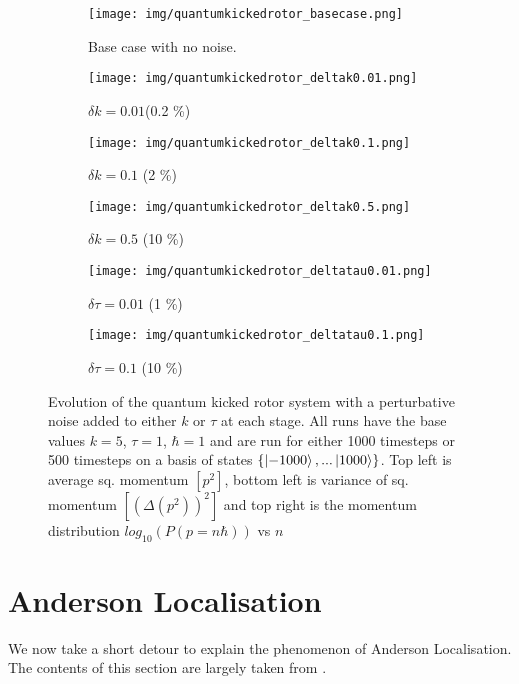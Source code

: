\documentclass[twocolumn]{report}
\begin{document}
\begin{figure}
    \begin{subfigure}[b]{0.5 \textwidth}
        \texttt{[image: img/quantumkickedrotor\_basecase.png]}
        \centering
        \caption{Base case with no noise.}
    \end{subfigure}
    \begin{subfigure}[b]{0.5 \textwidth}
        \centering
        \texttt{[image: img/quantumkickedrotor\_deltak0.01.png]}
        \caption{$\delta k = 0.01$(0.2 \%)}
    \end{subfigure}
    \begin{subfigure}[b]{0.5 \textwidth}
        \centering
        \texttt{[image: img/quantumkickedrotor\_deltak0.1.png]}
        \caption{$\delta k = 0.1$ (2 \%)}
    \end{subfigure}
    \begin{subfigure}[b]{0.5 \textwidth}
        \centering
        \texttt{[image: img/quantumkickedrotor\_deltak0.5.png]}
        \caption{$\delta k = 0.5$ (10 \%)}
    \end{subfigure}
    \begin{subfigure}[b]{0.5 \textwidth}
        \centering
        \texttt{[image: img/quantumkickedrotor\_deltatau0.01.png]}
        \caption{$\delta \tau = 0.01$ (1 \%)}
    \end{subfigure}
    \begin{subfigure}[b]{0.5 \textwidth}
        \centering
        \texttt{[image: img/quantumkickedrotor\_deltatau0.1.png]}
        \caption{$\delta \tau = 0.1$ (10 \%)}
    \end{subfigure}
    \caption{Evolution of the quantum kicked rotor system with a perturbative
    noise added to either $k$ or $\tau$ at each stage. All runs have the base
    values $k = 5$, $\tau = 1$, $\hbar = 1$ and are run for either 1000
    timesteps or 500 timesteps on a basis of states
    $\{\ket{-1000}, ...\ket{1000}\}$. Top left is average sq.
    momentum $[p^2]$, bottom left is variance of sq. momentum
    $[(\Delta(p^2))^2]$ and top right is the momentum distribution
    $log_{10}(P(p = n\hbar))$ vs $n$}
    \label{fig:robustnessplot}
\end{figure}

\twocolumn
\section{Anderson Localisation}
We now take a short detour to explain the phenomenon of Anderson Localisation.
The contents of this section are largely taken from \cite{muller_disorder_2016}.
\end{document}
